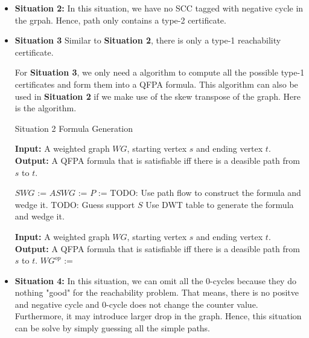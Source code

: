 \documentclass{article}
\begin{document}
\begin{itemize}
\begin{algorithm}
\begin{algorithmic}
		
	\end{algorithmic}
\end{algorithm}



\item \textbf{Situation 2:}
In this situation, we have no SCC tagged with negative cycle in the grpah. Hence, path only contains a type-2 certificate.

\item \textbf{Situation 3}
Similar to \textbf{Situation 2}, there is only a type-1 reachability certificate.

For \textbf{Situation 3}, we only need a algorithm to compute all the possible type-1 certificates and form them into a QFPA formula. This algorithm can also be used in \textbf{Situation 2} if we make use of the skew transpose of the graph.
Here is the algorithm.
\begin{algorithm}
	\caption{Situation 2 Formula Generation}
	\begin{algorithmic}
		\State {}
			\State \textbf{Input:} A weighted graph $WG$, starting vertex $s$ and ending vertex $t$.
			\State \textbf{Output:} A QFPA formula that is satisfiable iff there is a deasible path from $s$ to $t$.
			
			\State $SWG$ := 
			\State $ASWG$ := 
			\State $P$ := 
						\State TODO:
						\State Use path flow to construct the formula and wedge it.
					\Else
						\State TODO:
						\State Guess support $S$
						\State {}
						\State Use DWT table to generate the formula and wedge it.
					\EndIf
				\EndFor
				
			\EndFor
		\EndFunction
		
		\State {}
			\State \textbf{Input:} A weighted graph $WG$, starting vertex $s$ and ending vertex $t$.
			\State \textbf{Output:} A QFPA formula that is satisfiable iff there is a deasible path from $s$ to $t$.
			\State $WG^{op}$ := 
			\State \Return {}
		\EndFunction
	\end{algorithmic}
\end{algorithm}

\item \textbf{Situation 4:}
In this situation, we can omit all the 0-cycles because they do nothing "good" for the reachability problem. That means, there is no positve and negative cycle and 0-cycle does not change the counter value. Furthermore, it may introduce larger drop in the graph. Hence, this situation can be solve by simply guessing all the simple paths.
\end{itemize}
\end{document}
